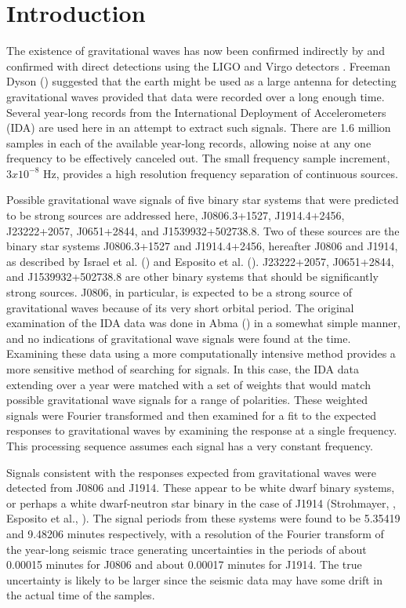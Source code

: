 
\section{Introduction}

The existence of gravitational waves has now been confirmed indirectly by \citet{1975ApJ} and confirmed with direct detections using the LIGO and Virgo detectors \citep{PhysRevLett.119.161101}.
Freeman Dyson (\citeyear{dyson}) 
suggested that the earth might be used as a large antenna for detecting gravitational waves
 provided that data were recorded over a long enough time. 
Several year-long records from the International Deployment of Accelerometers (IDA) are used here 
in an attempt to extract such signals.
There are 1.6 million samples in each of the available year-long records,
allowing noise at any one frequency to be effectively canceled out.
The small frequency sample increment, $3x10^{-8}$ Hz, provides a 
high resolution frequency
separation of continuous sources.

Possible gravitational wave signals of five binary star systems that were predicted to be strong sources are addressed here, J0806.3+1527, J1914.4+2456, J23222+2057, J0651+2844, and J1539932+502738.8.
 Two of these sources are 
the binary star systems J0806.3+1527 and J1914.4+2456, hereafter J0806 and J1914, as described by 
Israel et al. (\citeyear{Israel}) 
and Esposito et al. (\citeyear{swift}).
J23222+2057, J0651+2844, and J1539932+502738.8 are other binary systems that should be significantly strong sources.
J0806, in particular, is expected to be a strong source of gravitational waves because of its very short orbital period.
The original examination of the IDA data was done in Abma (\citeyear{raya1}) in a somewhat simple manner, and no indications of gravitational wave signals were found at the time. 
Examining these data using a more computationally intensive method provides a more sensitive method of searching for signals.
In this case, the IDA data extending over a year were matched with a set of weights that would match possible gravitational wave signals for a range of polarities.  These weighted signals were Fourier transformed and then examined for a fit to the expected responses to gravitational waves by examining the response at a single frequency.  This processing sequence assumes each signal has a very constant frequency.

Signals consistent with the responses expected from gravitational waves were detected from J0806 and J1914.  
These appear to be white dwarf binary systems, or perhaps a white dwarf-neutron star binary in the case of J1914 (Strohmayer, \citeyear{Strohmayer}, Esposito et al., \citeyear{swift}).  
The signal periods from these systems were found to be 5.35419 and 9.48206  minutes respectively, with a resolution of the Fourier transform of the year-long seismic trace generating uncertainties in the periods of about 0.00015 minutes for J0806 and about 0.00017 minutes for J1914. The true uncertainty is likely to be larger since the seismic data may have some drift in the actual time of the samples. 



